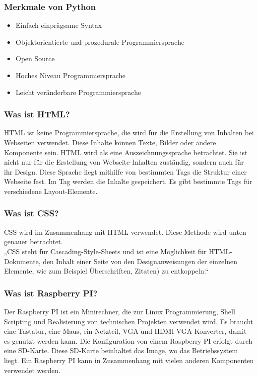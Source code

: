 \subsubsection{Merkmale von Python} 
\begin{itemize}
	\item Einfach einprägsame Syntax
\end{itemize}
\begin{itemize}
	\item Objektorientierte und prozedurale Programmiersprache
\end{itemize}
\begin{itemize}
	\item Open Source 
\end{itemize}
\begin{itemize}
	\item Hoches Niveau Programmiersprache
\end{itemize}
\begin{itemize}
	\item Leicht veränderbare Programmiersprache
\end{itemize}
\subsubsection{Was ist HTML?} 
HTML ist keine Programmiersprache, die wird für die Erstellung von Inhalten bei Webseiten verwendet. Diese Inhalte können Texte, Bilder oder andere Komponente sein. HTML wird als eine Auszeichnungssprache betrachtet. Sie ist nicht nur für die Erstellung von Webseite-Inhalten zuständig, sondern auch für ihr Design. Diese Sprache liegt mithilfe von bestimmten Tags die Struktur einer Webseite fest. Im Tag werden die Inhalte gespeichert. Es gibt bestimmte Tags für verschiedene Layout-Elemente. %
\subsubsection{Was ist CSS?} 
CSS wird im Zusammenhang mit HTML verwendet. Diese Methode wird unten genauer betrachtet. \\
„CSS steht für Cascading-Style-Sheets und ist eine Möglichkeit für HTML-Dokumente, den Inhalt einer Seite von den Designanweisungen der einzelnen Elemente, wie zum Beispiel Überschriften, Zitaten) zu entkoppeln.“ 
\subsubsection{Was ist Raspberry PI?} 
Der Raspberry PI ist ein Minirechner, die zur Linux Programmierung, Shell Scripting und Realisierung von technischen Projekten verwendet wird. Es braucht eine Tastatur, eine Maus, ein Netzteil, VGA und HDMI-VGA Konverter, damit es genutzt werden kann. Die Konfiguration von einem Raspberry PI erfolgt durch eine SD-Karte. Diese SD-Karte beinhaltet das Image, wo das Betriebssystem liegt. Ein Raspberry PI kann in Zusammenhang mit vielen anderen Komponenten verwendet werden. 
